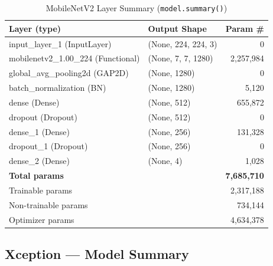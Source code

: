 \documentclass[12pt,a4paper]{article}
\begin{document}
\begin{table}[H]
\centering
\caption{MobileNetV2 Layer Summary (\texttt{model.summary()})}
\label{tab:summary_mobilenetv2}
\begin{tabular}{l l r}
  \toprule
  \textbf{Layer (type)} & \textbf{Output Shape} & \textbf{Param \#} \\
  \midrule
  input\_layer\_1 (InputLayer)         & (None, 224, 224, 3)  &           0 \\
  mobilenetv2\_1.00\_224 (Functional)  & (None, 7, 7, 1280)   &   2,257,984 \\
  global\_avg\_pooling2d (GAP2D)       & (None, 1280)         &           0 \\
  batch\_normalization (BN)            & (None, 1280)         &       5,120 \\
  dense (Dense)                        & (None, 512)          &     655,872 \\
  dropout (Dropout)                    & (None, 512)          &           0 \\
  dense\_1 (Dense)                     & (None, 256)          &     131,328 \\
  dropout\_1 (Dropout)                 & (None, 256)          &           0 \\
  dense\_2 (Dense)                     & (None, 4)            &       1,028 \\
  \midrule
  \multicolumn{2}{l}{\textbf{Total params}}    & \textbf{7,685,710} \\
  \multicolumn{2}{l}{Trainable params}         &     2,317,188 \\
  \multicolumn{2}{l}{Non-trainable params}     &       734,144 \\
  \multicolumn{2}{l}{Optimizer params}         &     4,634,378 \\
  \bottomrule
\end{tabular}
\end{table}

\subsection{Xception --- Model Summary}
\end{document}
